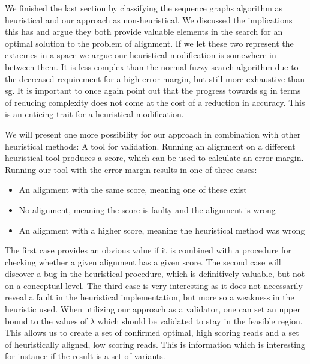 \documentclass[thesis.tex]{subfiles}
\begin{document}
\par\noindent
We finished the last section by classifying the sequence graphs algorithm as heuristical and our approach as non-heuristical. We discussed the implications this has and argue they both provide valuable elements in the search for an optimal solution to the problem of alignment. If we let these two represent the extremes in a space we argue our heuristical modification is somewhere in between them. It is less complex than the normal fuzzy search algorithm due to the decreased requirement for a high error margin, but still more exhaustive than sg. It is important to once again point out that the progress towards sg in terms of reducing complexity does not come at the cost of a reduction in accuracy. This is an enticing trait for a heuristical modification.\\
\par\noindent
We will present one more possibility for our approach in combination with other heuristical methods: A tool for validation. Running an alignment on a different heuristical tool produces a score, which can be used to calculate an error margin. Running our tool with the error margin results in one of three cases:
\begin{itemize}
  \item An alignment with the same score, meaning one of these exist
  \item No alignment, meaning the score is faulty and the alignment is wrong
  \item An alignment with a higher score, meaning the heuristical method was wrong
\end{itemize}
The first case provides an obvious value if it is combined with a procedure for checking whether a given alignment has a given score. The second case will discover a bug in the heuristical procedure, which is definitively valuable, but not on a conceptual level. The third case is very interesting as it does not necessarily reveal a fault in the heuristical implementation, but more so a weakness in the heuristic used. When utilizing our approach as a validator, one can set an upper bound to the values of $\lambda$ which should be validated to stay in the feasible region. This allows us to create a set of confirmed optimal, high scoring reads and a set of heuristically aligned, low scoring reads. This is information which is interesting for instance if the result is a set of variants.
\end{document}
